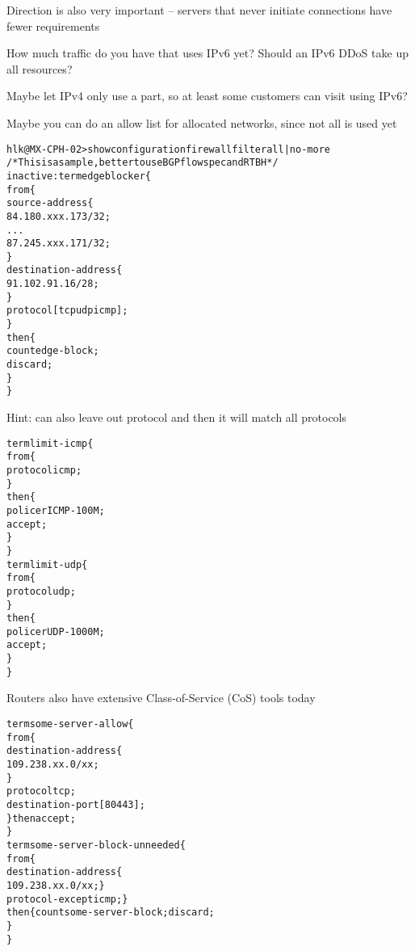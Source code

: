 \documentclass[Screen16to9,17pt]{foils}
\begin{document}
\begin{list2}
\item Direction is also very important -- servers that never initiate connections have fewer requirements
\item How much traffic do you have that uses IPv6 yet? Should an IPv6 DDoS take up all resources?
\item Maybe let IPv4 only use a part, so at least some customers can visit using IPv6?
\item Maybe you can do an allow list for allocated networks, since not all is used yet
\end{list2}



\begin{alltt}\footnotesize
hlk@MX-CPH-02> show configuration firewall filter all | no-more
/* This is a sample, better to use BGP flowspec and RTBH */
inactive: term edgeblocker \{
    from \{
        source-address \{
            84.180.xxx.173/32;
...
            87.245.xxx.171/32;
        \}
        destination-address \{
            91.102.91.16/28;
        \}
        protocol [ tcp udp icmp ];
    \}
    then \{
        count edge-block;
        discard;
    \}
\}
\end{alltt}
Hint: can also leave out protocol and then it will match all protocols


\begin{alltt}\footnotesize
term limit-icmp \{
    from \{
        protocol icmp;
    \}
    then \{
        policer ICMP-100M;
        accept;
    \}
\}
term limit-udp \{
    from \{
        protocol udp;
    \}
    then \{
        policer UDP-1000M;
        accept;
    \}
\}
\end{alltt}

Routers also have extensive Class-of-Service (CoS) tools today


\begin{alltt}\footnotesize
term some-server-allow \{
    from \{
        destination-address \{
            109.238.xx.0/xx;
        \}
        protocol tcp;
        destination-port [ 80 443 ];
    \} then accept;
\}
term some-server-block-unneeded \{
    from \{
        destination-address \{
            109.238.xx.0/xx; \}
        protocol-except icmp;  \}
    then \{ count some-server-block; discard;
    \}
\}
\end{alltt}
\end{document}
